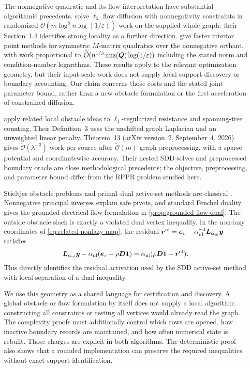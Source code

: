 The nonnegative quadratic and its flow interpretation have substantial
algorithmic precedents. \citet[Theorem~1.1]{chen2021diffusion} solve
$\ell_2$ flow diffusion with nonnegativity constraints in randomized
$\mathcal{O}(m\log^8 n\log(1/\varepsilon))$ work on the supplied whole graph;
their Section~1.4 identifies strong locality as a further direction.
\citet[Theorem~2 and Corollary~3]{vladu2025barrier} give faster interior
point methods for symmetric $M$-matrix quadratics over the nonnegative
orthant, with work proportional to
$\widetilde{\mathcal{O}}(n^{1/3}\operatorname{nnz}(\bm{Q})\log(1/\varepsilon))$
including the stated norm and condition-number logarithms. These results
apply to the relevant optimization geometry, but their input-scale work
does not supply local support discovery or boundary accounting. Our claim
concerns those costs and the stated joint parameter bound, rather than a
new obstacle formulation or the first acceleration of constrained diffusion.

\citet{li2026resistance} apply related local obstacle ideas to
$\ell_1$-regularized resistance and spanning-tree counting. Their
Definition~3 uses the unshifted graph Laplacian and an unweighted linear
penalty. Theorem~13 (arXiv version~2, September~4, 2026) gives
$\widetilde{\mathcal{O}}(\lambda^{-3})$ work per source after
$\widetilde{\mathcal{O}}(m)$ graph preprocessing, with a sparse potential and
coordinatewise accuracy. Their nested SDD solves and preprocessed boundary
oracle are close methodological precedents; the objective, preprocessing,
and parameter bound differ from the RPPR problem studied here.

Stieltjes obstacle problems and primal--dual active-set methods are classical
\citep{karkkainen2003augmented}. Nonnegative principal inverses explain safe
pivots, and standard Fenchel duality gives the grounded electrical-flow
formulation in \cref{prop:grounded-flow-dual}. The outside obstacle slack is
exactly a violated dual vertex inequality. In the non-lazy coordinates of
\cref{eq:related-nonlazy-map}, the residual
$\bm{r}^{\mathrm{nl}}=\bm{e}_{v}-\alpha_{\mathrm{nl}}^{-1}\bm{L}_{\alpha_{\mathrm{nl}}}\bm{y}$
satisfies
\[
 \bm{L}_{\alpha_{\mathrm{nl}}}\bm{y}
       -\alpha_{\mathrm{nl}}(\bm{e}_{v}-\rho\bm{D}\mathbf{1})
 =\alpha_{\mathrm{nl}}(\rho\bm{D}\mathbf{1}-\bm{r}^{\mathrm{nl}}).
\]
This directly identifies the residual activation used by the SDD active-set
method with local separation of a dual inequality.

We use this geometry as a shared language for certification and discovery.
A global obstacle or flow formulation by itself does not supply a local
algorithm: constructing all constraints or testing all vertices would
already read the graph. The complexity proofs must additionally control
which rows are opened, how inactive boundary records are maintained, and
how often numerical state is rebuilt. Those charges are explicit in both
algorithms. The deterministic proof also shows that a rounded implementation
can preserve the required inequalities without exact support identification.
